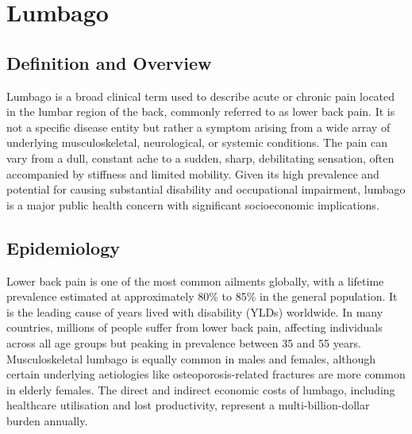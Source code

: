 \chapter{Lumbago}

\section*{Definition and Overview}
Lumbago is a broad clinical term used to describe acute or chronic pain located in the lumbar region of the back, commonly referred to as lower back pain. It is not a specific disease entity but rather a symptom arising from a wide array of underlying musculoskeletal, neurological, or systemic conditions. The pain can vary from a dull, constant ache to a sudden, sharp, debilitating sensation, often accompanied by stiffness and limited mobility. Given its high prevalence and potential for causing substantial disability and occupational impairment, lumbago is a major public health concern with significant socioeconomic implications.

\section*{Epidemiology}
Lower back pain is one of the most common ailments globally, with a lifetime prevalence estimated at approximately 80\% to 85\% in the general population. It is the leading cause of years lived with disability (YLDs) worldwide. In many countries, millions of people suffer from lower back pain, affecting individuals across all age groups but peaking in prevalence between 35 and 55 years. Musculoskeletal lumbago is equally common in males and females, although certain underlying aetiologies like osteoporosis-related fractures are more common in elderly females. The direct and indirect economic costs of lumbago, including healthcare utilisation and lost productivity, represent a multi-billion-dollar burden annually.

